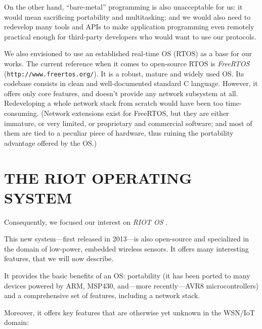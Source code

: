 \documentclass[a4paper,twoside]{article}
\begin{document}
On the other hand, ``bare-metal'' programming is also unacceptable for us:
it would mean sacrificing portability and multitasking; and we would also
need to redevelop many tools and APIs to make application programming
even remotely practical enough for third-party developers who would
want to use our protocols.

We also envisioned to use an established real-time OS (RTOS) as a base
for our works. The current reference when it comes to open-source RTOS is
\emph{FreeRTOS} (\texttt{http://www.freertos.org/}). It is a robust, mature
and widely used OS. Its codebase consists in clean and well-documented
standard C language. However, it offers only core features, and doesn't
provide any network subsystem at all. Redeveloping a whole network stack
from scratch would have been too time-consuming.
(Network extensions exist for FreeRTOS, but they are either immature,
or very limited, or proprietary and commercial software; and most of them
are tied to a peculiar piece of hardware, thus ruining
the portability advantage offered by the OS.)


\section{\uppercase{The RIOT Operating System}}

Consequently, we focused our interest on \emph{RIOT OS} \cite{RIOT}.

This new system---first released in 2013---is also open-source and
specialized in the domain of low-power, embedded wireless sensors.
It offers many interesting features, that we will now describe.

It provides the basic benefits of an OS: portability (it has been ported
to many devices powered by ARM, MSP430, and---more recently---AVR8
microcontrollers) and a comprehensive set of features, including
a network stack.

Moreover, it offers key features that are otherwise yet unknown in
the WSN/IoT domain:
\end{document}
